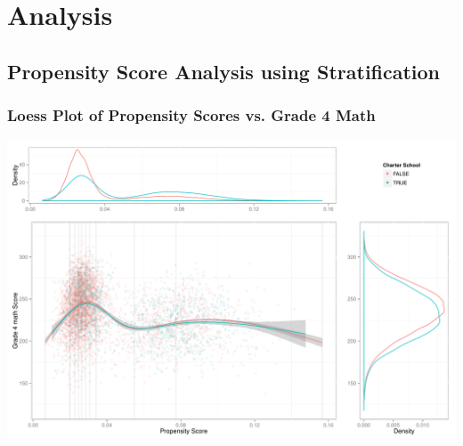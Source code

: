 \documentclass[10pt,handout,mathserif]{beamer}
\begin{document}
\section{Analysis}

\subsection{Propensity Score Analysis using Stratification}

\begin{frame}[c]
	\frametitle{Loess Plot of Propensity Scores vs. Grade 4 Math}
	\begin{center}
	\includegraphics[width=0.9\paperwidth,keepaspectratio]{../Figures2009/g4math-loess}
	\end{center}
\end{frame}
\end{document}
